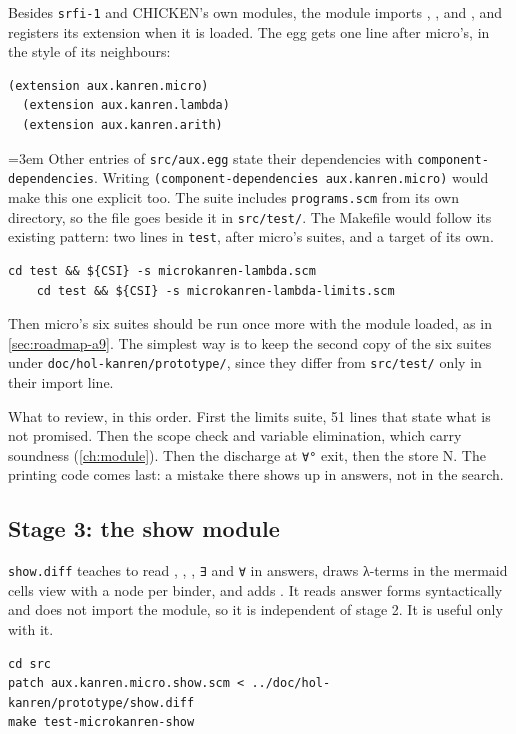 Besides \texttt{srfi-1} and CHICKEN's own modules, the module imports , ,
 and \micro, and registers
its extension when it is loaded. The egg gets one line after micro's, in the style of its neighbours:
\begin{Verbatim}[xrightmargin=-\overhang]
  (extension aux.kanren.micro)
  (extension aux.kanren.lambda)
  (extension aux.kanren.arith)
\end{Verbatim}
{\emergencystretch=3em
Other entries of \texttt{src/aux.egg} state their dependencies with \texttt{component-dependencies}. Writing
\texttt{(component-dependencies aux.kanren.micro)} would make this one explicit too. The suite
includes \texttt{programs.scm} from its own directory, so the file goes beside it in
\texttt{src/test/}. The Makefile would follow its existing pattern: two lines in \texttt{test}, after
micro's suites, and a target of its own.\par}
\begin{Verbatim}[xrightmargin=-\overhang]
	cd test && ${CSI} -s microkanren-lambda.scm
	cd test && ${CSI} -s microkanren-lambda-limits.scm
\end{Verbatim}
Then micro's six suites should be run once more with the module loaded, as in
\cref{sec:roadmap-a9}. The simplest way is to keep the second copy of the six suites under
\texttt{doc/hol-kanren/prototype/}, since they differ from \texttt{src/test/} only in their import line.

What to review, in this order. First the limits suite, 51 lines that state what is not promised. Then
the scope check and variable elimination, which carry soundness (\cref{ch:module}). Then the discharge
at \texttt{∀°} exit, then the store N. The printing code comes last: a mistake there shows up in answers,
not in the search.

\subsection{Stage 3: the show module}\label{sec:roadmap-stage3}

\texttt{show.diff} teaches  to read , , , \texttt{∃} and
\texttt{∀} in answers, draws λ-terms in the mermaid cells view with a node per binder, and adds
. It reads answer forms syntactically and does not import the module, so it is independent
of stage 2. It is useful only with it.
\begin{Verbatim}[xrightmargin=-\overhang]
cd src
patch aux.kanren.micro.show.scm < ../doc/hol-kanren/prototype/show.diff
make test-microkanren-show
\end{Verbatim}

